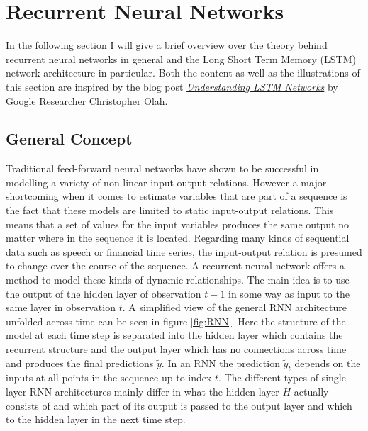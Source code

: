 \chapter{Recurrent Neural Networks}\label{Sec:Method}
In the following section I will give a brief overview over the theory behind recurrent neural networks in general and the Long Short Term Memory (LSTM) network architecture in particular. Both the content as well as the illustrations of this section are inspired by the blog post \href{http://colah.github.io/posts/2015-08-Understanding-LSTMs/}{\textit{Understanding LSTM Networks}} by Google Researcher Christopher Olah.
\section{General Concept}
Traditional feed-forward neural networks have shown to be successful in modelling a variety of non-linear input-output relations. However a major shortcoming when it comes to estimate variables that are part of a sequence is the fact that these models are limited to static input-output relations. This means that a set of values for the input variables produces the same output no matter where in the sequence it is located. Regarding many kinds of sequential data such as speech or financial time series, the input-output relation is presumed to change over the course of the sequence. A recurrent neural network offers a method to model these kinds of dynamic relationships. The main idea is to use the output of the hidden layer of observation $t-1$ in some way as input to the same layer in observation $t$. A simplified view of the general RNN architecture unfolded across time can be seen in figure \ref{fig:RNN}. Here the structure of the model at each time step is separated into the hidden layer which contains the recurrent structure and the output layer which has no connections across time and produces the final predictions $\tilde{y}$. In an RNN the prediction $\tilde{y}_t$ depends on the inputs at all points in the sequence up to index $t$.
The different types of single layer RNN architectures mainly differ in what the hidden layer $H$ actually consists of and which part of its output is passed to the output layer and which to the hidden layer in the next time step. 
